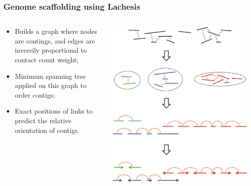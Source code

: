 \documentclass[xcolor=dvipsnames]{beamer}
\begin{document}
\begin{frame}
\frametitle{Genome scaffolding using Lachesis}
\begin{columns}
\begin{column}{0.59\linewidth}
\begin{itemize}[label={$\bullet$}]
\item Builds a graph where nodes are contings, and edges are inversily
proportional to contact count weight;
\item Minimum spanning tree applied on this graph to order contigs;
\item Exact positions of links to predict the relative orientation of contigs.
\end{itemize}
\end{column}
\begin{column}{0.49\linewidth}
\includegraphics[width=\linewidth]{figures/lachesis_scaffolding.png}
\end{column}
\end{columns}
\end{frame}
\end{document}
